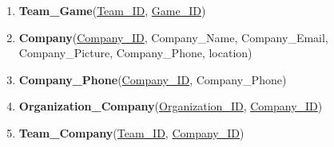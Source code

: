 \begin{enumerate}
    \item \textbf{Team\_Game}(\underline{Team\_ID}, \underline{Game\_ID})


    \item \textbf{Company}(\underline{Company\_ID}, Company\_Name, Company\_Email, Company\_Picture, Company\_Phone, location)
    \item \textbf{Company\_Phone}(\underline{Company\_ID}, Company\_Phone)
    \item \textbf{Organization\_Company}(\underline{Organization\_ID}, \underline{Company\_ID})


    \item \textbf{Team\_Company}(\underline{Team\_ID}, \underline{Company\_ID})
\end{enumerate}